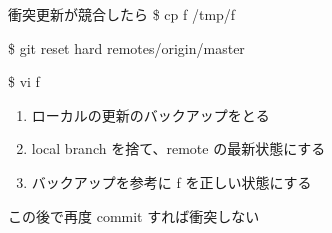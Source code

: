 \begin{frame}[t]{衝突}{更新が競合したら}
  \$ cp f /tmp/f

  \$ git reset {\dhyphen}hard remotes/origin/master

  \$ vi f
  \vspace{2ex}

  \begin{enumerate}
  \item ローカルの更新のバックアップをとる
  \item local branch を捨て、remote の最新状態にする
  \item バックアップを参考に f を正しい状態にする
  \end{enumerate}
  \vspace{2ex}

  この後で再度 commit すれば衝突しない
  \vspace{2ex}

\end{frame}
